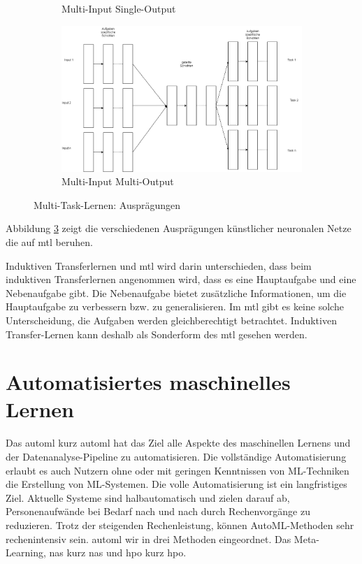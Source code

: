 \begin{figure}[h]
\begin{subfigure}[c]{0.45\textwidth}
				\caption[MTL-MISO]{Multi-Input Single-Output}
				\label{img:MTL_MISO}	
			\end{subfigure}
			\begin{subfigure}[c]{0.45\textwidth}			
				\includegraphics[width=1\textwidth, center]{bilder/Grundlagen/MTL/MTL_MIMO.png}
				\caption[MTL-MIMO]{Multi-Input Multi-Output}
				\label{img:MTL-MIMO}	
			\end{subfigure}
			\caption{Multi-Task-Lernen: Ausprägungen}
			\label{img:MultiTaskLernen}
		\end{figure}
		Abbildung \ref{img:MultiTaskLernen} zeigt die verschiedenen Ausprägungen künstlicher neuronalen Netze die auf \ac{mtl} beruhen.
		
		Induktiven Transferlernen und \ac{mtl} wird darin unterschieden, dass beim induktiven Transferlernen angenommen wird, dass es eine Hauptaufgabe und eine Nebenaufgabe gibt. Die Nebenaufgabe bietet zusätzliche Informationen, um die Hauptaufgabe zu verbessern bzw. zu generalisieren. Im \ac{mtl} gibt es keine solche Unterscheidung, die Aufgaben werden gleichberechtigt betrachtet. Induktiven Transfer-Lernen kann deshalb als Sonderform des \ac{mtl} gesehen werden. \cite{Thung.2018} \cite{Pan.2010}
		
		

	\section{Automatisiertes maschinelles Lernen}
	\label{sec:AutoML}
	 Das \acl{automl} kurz \ac{automl} hat das Ziel alle Aspekte des maschinellen Lernens und der Datenanalyse-Pipeline zu automatisieren. Die vollständige Automatisierung erlaubt es auch Nutzern ohne oder mit geringen Kenntnissen von ML-Techniken die Erstellung von ML-Systemen. 
	Die volle Automatisierung ist ein langfristiges Ziel. Aktuelle Systeme sind halbautomatisch und zielen darauf ab, Personenaufwände bei Bedarf nach und nach durch Rechenvorgänge zu reduzieren. Trotz der steigenden Rechenleistung, können AutoML-Methoden sehr rechenintensiv sein.  \ac{automl} wir in drei Methoden eingeordnet. Das Meta-Learning, \acl{nas} kurz \ac{nas} und \acl{hpo} kurz \ac{hpo}. \cite{Hutter.2019} 
	
